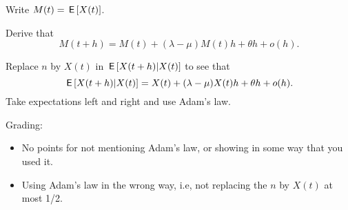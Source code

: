 Write $M(t) = \,\mathsf{E}\left[X(t)\right]$.
\begin{exercise}[1]
Derive that
\begin{equation}
M(t+h)  =  M(t) + (\lambda  - \mu) M(t) h + \theta h + o(h).
\end{equation}
\begin{solution}
  Replace $n$ by $X(t)$ in $\,\mathsf{E}\left[X(t+h)|X(t)\right]$ to see that
\begin{equation}
\,\mathsf{E}\left[X(t+h) | X(t) \right]   = X(t)  + (\lambda  - \mu) X(t) h + \theta h + o(h).
\end{equation}
Take expectations left and right and use Adam's law.

Grading:
\begin{itemize}
\item No points for not mentioning Adam's law, or showing in some way that you used it.
\item Using Adam's law in the wrong way, i.e, not replacing the $n$ by $X(t)$ at most 1/2.
\end{itemize}

\end{solution}
\end{exercise}
